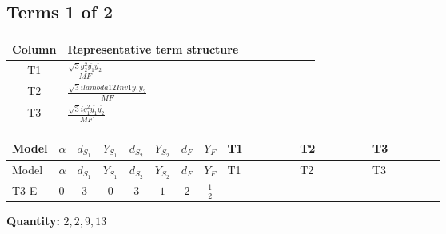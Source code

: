\documentclass[8pt]{article}
\begin{document}
\begin{landscape}
\subsection*{Terms 1 of 2}
\begin{center}
\begin{tabular}{@{}c >{\raggedright\arraybackslash}p{0.82\linewidth}@{}}
\toprule
Column & Representative term structure \\
\midrule
T1 & \(\displaystyle \frac{\sqrt{3} g_{2}^{2} \overline{y_{1}} \overline{y_{2}}}{MF}\) \\
\midrule
T2 & \(\displaystyle \frac{\sqrt{3} i lambda12Inv1 \overline{y_{1}} \overline{y_{2}}}{MF}\) \\
\midrule
T3 & \(\displaystyle \frac{\sqrt{3} i g_{1}^{2} \overline{y_{1}} \overline{y_{2}}}{MF}\) \\
\midrule
\bottomrule
\end{tabular}
\end{center}
\smallskip
\tiny
\begin{longtable}{@{}llcccccc >{\raggedright\arraybackslash}p{0.21\linewidth} >{\raggedright\arraybackslash}p{0.21\linewidth} >{\raggedright\arraybackslash}p{0.21\linewidth}@{}}
\toprule
Model & $\alpha$ & $d_{S_1}$ & $Y_{S_1}$ & $d_{S_2}$ & $Y_{S_2}$ & $d_F$ & $Y_F$ & T1 & T2 & T3 \\
\midrule
\endfirsthead
\toprule
Model & $\alpha$ & $d_{S_1}$ & $Y_{S_1}$ & $d_{S_2}$ & $Y_{S_2}$ & $d_F$ & $Y_F$ & T1 & T2 & T3 \\
\midrule
\endhead
T3-E & $0$ & $3$ & $0$ & $3$ & $1$ & $2$ & $\frac{1}{2}$ & \scriptsize\adjustbox{max width=\linewidth}{$\begin{gathered} - \frac{\sqrt{3} g_{2}^{2} \overline{y_{1}} \overline{y_{2}}}{6 MF}\end{gathered}$} & \scriptsize\adjustbox{max width=\linewidth}{$\begin{gathered} - \frac{\sqrt{3} i lambda12Inv1 \overline{y_{1}} \overline{y_{2}}}{6 MF}\end{gathered}$} & \scriptsize\adjustbox{max width=\linewidth}{$\begin{gathered} \frac{\sqrt{3} i g_{1}^{2} \overline{y_{1}} \overline{y_{2}}}{8 MF}\end{gathered}$} \\
\midrule
\bottomrule
\end{longtable}
\clearpage
\noindent\textbf{Quantity: }$\mathrm{2,2,9,13}$\par\smallskip

\end{landscape}
\end{document}
